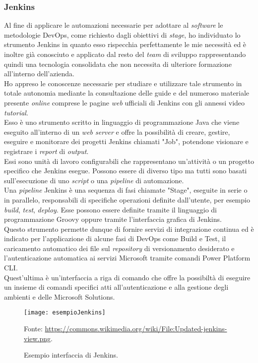 \subsubsection*{Jenkins}
Al fine di applicare le automazioni necessarie per adottare al \emph{software} le metodologie \gls{DevOps}, come richiesto dagli obiettivi di \emph{stage}, ho individuato lo strumento Jenkins in quanto esso rispecchia perfettamente le mie necessità ed è inoltre già conosciuto e applicato dal resto del \emph{team} di sviluppo rappresentando quindi una tecnologia consolidata che non necessita di ulteriore formazione all'interno dell'azienda.\\
Ho appreso le conoscenze necessarie per studiare e utilizzare tale strumento in totale autonomia mediante la consultazione delle guide e del numeroso materiale presente \emph{online} comprese le pagine \emph{web} ufficiali di Jenkins con gli annessi video \emph{tutorial}.\\
Esso è uno strumento scritto in linguaggio di programmazione Java che viene eseguito all'interno di un \emph{web server} e offre la possibilità di creare, gestire, eseguire e monitorare dei progetti Jenkins chiamati "Job", potendone visionare e registrare i \emph{report} di \emph{output}.\\
Essi sono unità di lavoro configurabili che rappresentano un'attività o un progetto specifico che Jenkins esegue. Possono essere di diverso tipo ma tutti sono basati sull'esecuzione di uno \emph{script} o una \emph{pipeline} di automazione.\\
Una \emph{pipeline} Jenkins è una sequenza di fasi chiamate "Stage", eseguite in serie o in parallelo, responsabili di specifiche operazioni definite dall'utente, per esempio \emph{build}, \emph{test}, \emph{deploy}. Esse possono essere definite tramite il linguaggio di programmazione Groovy oppure tramite l'interfaccia grafica di Jenkins.\\
Questo strumento permette dunque di fornire servizi di integrazione continua ed è indicato per l'applicazione di alcune fasi di \gls{DevOps} come Build e Test, il caricamento automatico dei file sul \emph{repository} di versionamento desiderato e l'autenticazione automatica ai servizi Microsoft tramite comandi Power Platform CLI.\\
Quest'ultima è un'interfaccia a riga di comando che offre la possibiltà di eseguire un insieme di comandi specifici atti all'autenticazione e alla gestione degli ambienti e delle Microsoft Solutions.\\
\begin{figure}[htbp] 
    \centering 
    \texttt{[image: esempioJenkins]} 
    \caption{Esempio interfaccia di Jenkins.}
    \label{fig:esempioJenkins}
    \vspace{1mm}
    Fonte: \url{https://commons.wikimedia.org/wiki/File:Updated-jenkins-view.png}.
\end{figure}

